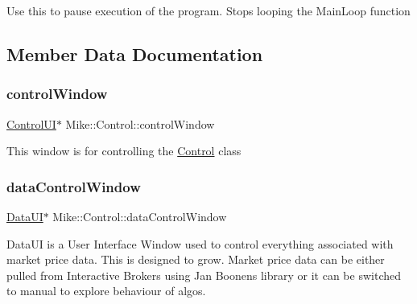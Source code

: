 Use this to pause execution of the program. Stops looping the Main\+Loop function 

\subsection{Member Data Documentation}
\mbox{\label{class_mike_1_1_control_ace0a737869d8dadfadc7cd0c191af872}} 
\subsubsection{\texorpdfstring{control\+Window}{controlWindow}}
{\footnotesize\ttfamily \hyperlink{class_mike_1_1_control_aba56a17e2d16d087731d215476fff47d}{Control\+UI}$\ast$ Mike\+::\+Control\+::control\+Window\hspace{0.3cm}{\ttfamily [private]}}

This window is for controlling the \hyperlink{class_mike_1_1_control}{Control} class \mbox{\label{class_mike_1_1_control_aaf1b458116247ebada43f8bb8faf3edf}} 
\subsubsection{\texorpdfstring{data\+Control\+Window}{dataControlWindow}}
{\footnotesize\ttfamily \hyperlink{class_mike_1_1_control_addbe39ef40982f0a4002b6f74091a799}{Data\+UI}$\ast$ Mike\+::\+Control\+::data\+Control\+Window\hspace{0.3cm}{\ttfamily [private]}}

Data\+UI is a User Interface Window used to control everything associated with market price data. This is designed to grow. Market price data can be either pulled from Interactive Brokers using Jan Boonen\textquotesingle{}s library or it can be switched to \textquotesingle{}manual\textquotesingle{} to explore behaviour of algos. \mbox{\label{class_mike_1_1_control_a800d1dc7b58dc3af7c081225009c898f}} 
